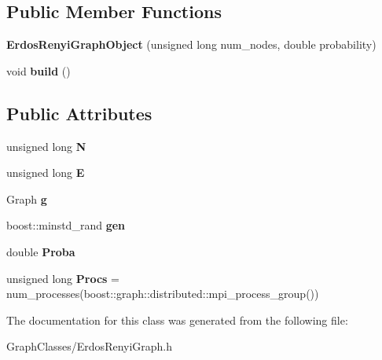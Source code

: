 \subsection*{Public Member Functions}
\begin{DoxyCompactItemize}
\item 
\mbox{\label{classErdosRenyiGraphObject_ab0b1e8a1e89891ddf11069dee9343209}} 
{\bfseries Erdos\+Renyi\+Graph\+Object} (unsigned long num\+\_\+nodes, double probability)
\item 
\mbox{\label{classErdosRenyiGraphObject_abc4d4b8856503811bafc314e1a8f8e9e}} 
void {\bfseries build} ()
\end{DoxyCompactItemize}
\subsection*{Public Attributes}
\begin{DoxyCompactItemize}
\item 
\mbox{\label{classErdosRenyiGraphObject_a1f325e8c05b6b6d18eabc9c5edb9db1c}} 
unsigned long {\bfseries N}
\item 
\mbox{\label{classErdosRenyiGraphObject_a6eeee359c03d9b94fb9098e386da2010}} 
unsigned long {\bfseries E}
\item 
\mbox{\label{classErdosRenyiGraphObject_a4d57ccaf608593ef8b5529c19b65424c}} 
Graph {\bfseries g}
\item 
\mbox{\label{classErdosRenyiGraphObject_a3e074970e0a0e70815b9d9b7a5af5606}} 
boost\+::minstd\+\_\+rand {\bfseries gen}
\item 
\mbox{\label{classErdosRenyiGraphObject_a3f3449302cf97157245f1502616d6008}} 
double {\bfseries Proba}
\item 
\mbox{\label{classErdosRenyiGraphObject_a1e768ea11a266d6cc5b05819e02d1dc2}} 
unsigned long {\bfseries Procs} = num\+\_\+processes(boost\+::graph\+::distributed\+::mpi\+\_\+process\+\_\+group())
\end{DoxyCompactItemize}


The documentation for this class was generated from the following file\+:\begin{DoxyCompactItemize}
\item 
Graph\+Classes/Erdos\+Renyi\+Graph.\+h\end{DoxyCompactItemize}
